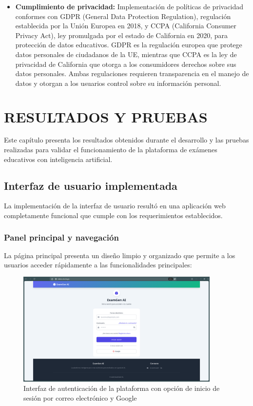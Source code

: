 \documentclass[12pt,a4paper]{report}
\begin{document}
\begin{itemize}
\item \textbf{Cumplimiento de privacidad:} Implementación de políticas de privacidad conformes con GDPR (General Data Protection Regulation), regulación establecida por la Unión Europea en 2018, y CCPA (California Consumer Privacy Act), ley promulgada por el estado de California en 2020, para protección de datos educativos. GDPR es la regulación europea que protege datos personales de ciudadanos de la UE, mientras que CCPA es la ley de privacidad de California que otorga a los consumidores derechos sobre sus datos personales. Ambas regulaciones requieren transparencia en el manejo de datos y otorgan a los usuarios control sobre su información personal.
\end{itemize}

\chapter{RESULTADOS Y PRUEBAS}

Este capítulo presenta los resultados obtenidos durante el desarrollo y las pruebas realizadas para validar el funcionamiento de la plataforma de exámenes educativos con inteligencia artificial.

\section{Interfaz de usuario implementada}

La implementación de la interfaz de usuario resultó en una aplicación web completamente funcional que cumple con los requerimientos establecidos.

\subsection{Panel principal y navegación}

La página principal presenta un diseño limpio y organizado que permite a los usuarios acceder rápidamente a las funcionalidades principales:

\begin{figure}[h]
\centering
\includegraphics[width=0.9\textwidth]{assets/250617_06h44m06s_screenshot.png}
\caption{Interfaz de autenticación de la plataforma con opción de inicio de sesión por correo electrónico y Google}
\label{fig:login}
\end{figure}
\end{document}
